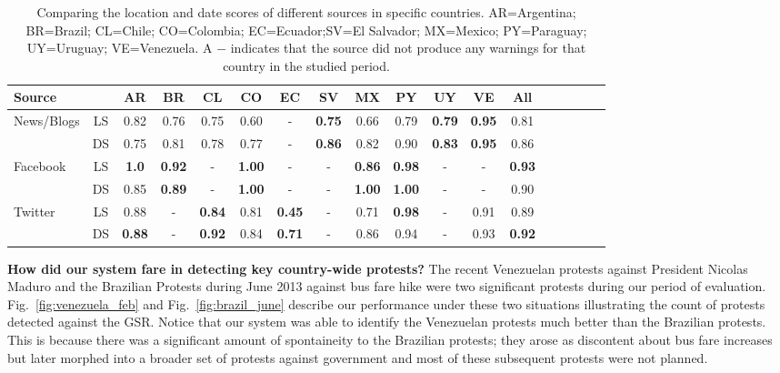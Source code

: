 \documentclass[letterpaper]{article}
\begin{document}
\begin{table} %
\centering
\small
\caption{\small Comparing the location and date scores of different sources in specific countries.
AR=Argentina; BR=Brazil; CL=Chile; CO=Colombia; EC=Ecuador;SV=El Salvador; MX=Mexico; PY=Paraguay; UY=Uruguay; VE=Venezuela. A $-$ indicates that the source did not produce any warnings for that country in the studied period.}
\label{tb:modelwisecomparison}
\begin{tabular}{||l|*{17}{c|}}
\hline
Source& & AR & BR & CL & CO & EC & SV & MX & PY & UY & VE & All\\
\hline
\multirow{2}{*}{News/Blogs} &LS &0.82&0.76&0.75&0.60&-&{\bf0.75}&0.66&0.79&{\bf0.79}&{\bf0.95}&0.81\\
                            &DS&0.75&0.81&0.78&0.77&-&{\bf0.86}&0.82&0.90&{\bf0.83}&{\bf0.95}&0.86\\
\hline
\multirow{2}{*}{Facebook} &LS &{\bf1.0}&{\bf0.92}&-&{\bf1.00}&-&-&{\bf0.86}&{\bf0.98}&-&-&{\bf0.93}\\
                          &DS&0.85&{\bf0.89}&-&{\bf1.00}&-&-&{\bf1.00}&{\bf1.00}&-&-&0.90\\
\hline
\multirow{2}{*}{Twitter} &LS &0.88&-&{\bf0.84}&0.81&{\bf0.45}&-&0.71&{\bf0.98}&-&0.91&0.89\\
                         &DS&{\bf0.88}&-&{\bf0.92}&0.84&{\bf0.71}&-&0.86&0.94&-&0.93&{\bf0.92}\\
\hline
\end{tabular}
\vspace{-4mm}
\end{table}

\noindent
{\bf How did our system fare in detecting key country-wide protests?}
The recent Venezuelan protests against President Nicolas Maduro and the Brazilian Protests during June 2013 against bus fare hike were two significant protests during our period of evaluation. Fig.~\ref{fig:venezuela_feb} and
Fig.~\ref{fig:brazil_june} describe our performance under these two situations illustrating the count
of protests detected against the GSR. Notice that our system was able to 
identify the Venezuelan protests much better than the Brazilian protests. This is because there was a significant amount
of spontaineity to the Brazilian protests; they arose as discontent about bus fare increases but later morphed into a broader
set of protests against government and most of these subsequent protests were not planned.\\
\end{document}
